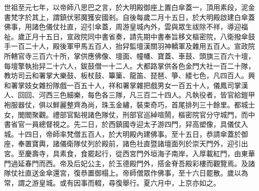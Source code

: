\begin{pinyinscope}
 世祖至元七年，以帝師八思巴之言，於大明殿御座上置白傘蓋一，頂用素段，泥金書梵字於其上，謂鎮伏邪魔獲安國剎。自後每歲二月十五日，於大明殿啟建白傘蓋佛事，用諸色儀仗社直，迎引傘蓋，周游皇城內外，雲與眾生祓除不祥，導迎福祉。歲正月十五日，宣政院同中書省奏，請先期中書奉旨移文樞密院，八衛撥傘鼓手一百二十人，殿後軍甲馬五百人，抬舁監壇漢關羽神轎軍及雜用五百人。宣政院所轄官寺三百六十所，掌供應佛像、壇面、幢幡、寶蓋、車鼓、頭旗三百六十壇，每壇擎執抬舁二十六人，鈸鼓僧一十二人。大都路掌供各色金門大社一百二十隊，教坊司云和署掌大樂鼓、板杖鼓、篳篥、龍笛、琵琶、箏、緌七色，凡四百人。興和署掌妓女雜扮隊戲一百五十人，祥和署掌雜把戲男女一百五十人，儀鳳司掌漢人、回回、河西三色細樂，每色各三隊，凡三百二十四人。凡執役者，皆官給鎧甲袍服器仗，俱以鮮麗整齊為尚，珠玉金繡，裝束奇巧，首尾排列三十餘里。都城士女，閭閻聚觀。禮部官點視諸色隊仗，刑部官巡綽喧鬧，樞密院官分守城門，而中書省官一員總督視之。先二日，於西鎮國寺迎太子游四門，舁高塑像，具儀仗入城。十四日，帝師率梵僧五百人，於大明殿內建佛事。至十五日，恭請傘蓋於御座，奉置寶輿，諸儀衛隊仗列於殿前，諸色社直暨諸壇面列於崇天門外，迎引出宮。至慶壽寺，具素食，食罷起行，從西宮門外垣海子南岸，入厚載紅門，由東華門過延春門而西。帝及后妃公主，於玉德殿門外，搭金脊吾殿彩樓而觀覽焉。及諸隊仗社直送金傘還宮，復恭置御榻上。帝師僧眾作佛事，至十六日罷散。歲以為常，謂之游皇城。或有因事而輟，尋復舉行。夏六月中，上京亦如之。



\end{pinyinscope}